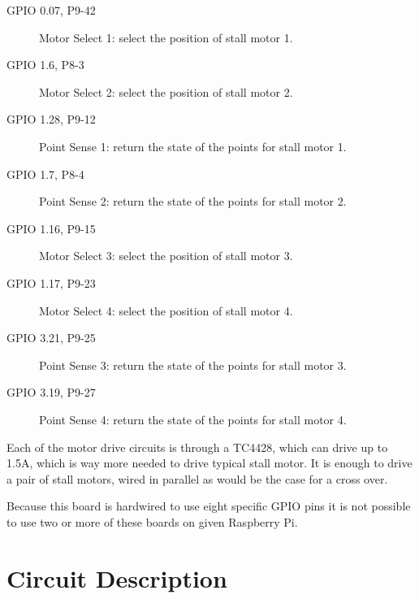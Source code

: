 \begin{description}
\item[GPIO 0.07, P9-42] Motor Select 1: select the position of stall motor 
1. 
\item[GPIO 1.6, P8-3] Motor Select 2: select the position of stall motor 
2. 
\item[GPIO 1.28, P9-12] Point Sense 1: return the state of the points for 
stall motor 1. 
\item[GPIO 1.7, P8-4] Point Sense 2: return the state of the points for 
stall motor 2. 
\item[GPIO 1.16, P9-15] Motor Select 3: select the position of stall motor 
3. 
\item[GPIO 1.17, P9-23] Motor Select 4: select the position of stall motor 
4. 
\item[GPIO 3.21, P9-25] Point Sense 3: return the state of the points for 
stall motor 3. 
\item[GPIO 3.19, P9-27] Point Sense 4: return the state of the points for 
stall motor 4. 
\end{description}

Each of the motor drive circuits is through a TC4428, which can drive up to
1.5A, which is way more needed to drive typical stall motor. It is enough to
drive a pair of stall motors, wired in parallel as would be the case for a
cross over. 

Because this board is hardwired to use eight specific GPIO pins it is not 
possible to use two or more of these boards on given Raspberry Pi.

\section{Circuit Description}

